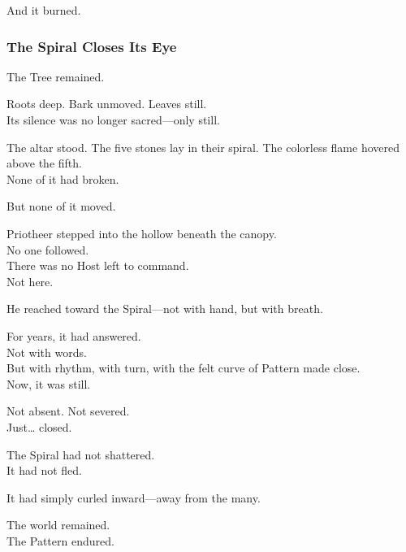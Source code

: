 \documentclass[12pt]{article}
\begin{document}
\vspace{0.5em}
And it burned.

\dotfill

\subsubsection*{The Spiral Closes Its Eye}

The Tree remained.

\vspace{0.5em}
Roots deep. Bark unmoved. Leaves still.\\
Its silence was no longer sacred---only still.

\vspace{0.5em}
The altar stood. The five stones lay in their spiral. The colorless flame hovered above the fifth.\\
None of it had broken.

\vspace{0.5em}
But none of it moved.

\vspace{0.5em}
Priotheer stepped into the hollow beneath the canopy.\\
No one followed.\\
There was no Host left to command.\\
Not here.

\vspace{0.5em}
He reached toward the Spiral---not with hand, but with breath.

\vspace{0.5em}
For years, it had answered.\\
Not with words.\\
But with rhythm, with turn, with the felt curve of Pattern made close.\\
Now, it was still.

\vspace{0.5em}
Not absent. Not severed.\\
Just\ldots{} closed.

\vspace{0.5em}
The Spiral had not shattered.\\
It had not fled.

\vspace{0.5em}
It had simply curled inward---away from the many.

\vspace{0.5em}
The world remained.\\
The Pattern endured.
\end{document}
